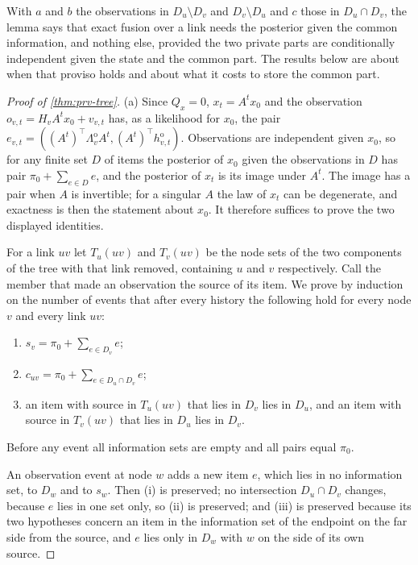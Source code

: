 With $a$ and $b$ the observations in $D_u\setminus D_v$ and $D_v\setminus D_u$ and $c$ those in $D_u\cap D_v$, the lemma says that exact fusion over a link needs the posterior given the common information, and nothing else, provided the two private parts are conditionally independent given the state and the common part. The results below are about when that proviso holds and about what it costs to store the common part.

\begin{proof}[Proof of \cref{thm:prv-tree}]
(a) Since $Q_x=0$, $x_t=A^tx_0$ and the observation $o_{v,t}=H_vA^tx_0+v_{v,t}$ has, as a likelihood for $x_0$, the pair $e_{v,t}=((A^t)^\top\Lambda^{\mathrm o}_vA^t,(A^t)^\top h^{\mathrm o}_{v,t})$. Observations are independent given $x_0$, so for any finite set $D$ of items the posterior of $x_0$ given the observations in $D$ has pair $\pi_0+\sum_{e\in D}e$, and the posterior of $x_t$ is its image under $A^t$. The image has a pair when $A$ is invertible; for a singular $A$ the law of $x_t$ can be degenerate, and exactness is then the statement about $x_0$. It therefore suffices to prove the two displayed identities.

For a link $uv$ let $T_u(uv)$ and $T_v(uv)$ be the node sets of the two components of the tree with that link removed, containing $u$ and $v$ respectively. Call the member that made an observation the source of its item. We prove by induction on the number of events that after every history the following hold for every node $v$ and every link $uv$:
\begin{enumerate}
\item[(i)] $s_v=\pi_0+\sum_{e\in D_v}e$;
\item[(ii)] $c_{uv}=\pi_0+\sum_{e\in D_u\cap D_v}e$;
\item[(iii)] an item with source in $T_u(uv)$ that lies in $D_v$ lies in $D_u$, and an item with source in $T_v(uv)$ that lies in $D_u$ lies in $D_v$.
\end{enumerate}
Before any event all information sets are empty and all pairs equal $\pi_0$.

An observation event at node $w$ adds a new item $e$, which lies in no information set, to $D_w$ and to $s_w$. Then (i) is preserved; no intersection $D_u\cap D_v$ changes, because $e$ lies in one set only, so (ii) is preserved; and (iii) is preserved because its two hypotheses concern an item in the information set of the endpoint on the far side from the source, and $e$ lies only in $D_w$ with $w$ on the side of its own source.


\end{proof}
